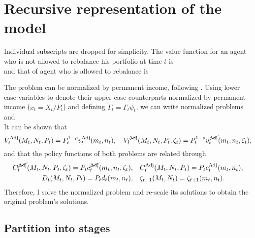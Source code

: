 \documentclass[./RiskyContrib.tex]{subfiles}
\begin{document}
\hypertarget{Recursive}{}
\section{Recursive representation of the model}


Individual subscripts are dropped for simplicity. The value function for
an agent who is not allowed to rebalance his portfolio at time $t$ is
\begin{equation*}
    
\end{equation*}
and that of agent who is allowed to rebalance is
\begin{equation*}
    
\end{equation*}

The problem can be normalized by permanent income, following
\cite{Carroll2020solvingmicrodsops}. Using lower case variables to
denote their upper-case counterparts normalized by permanent income ($x_t = X_t/P_t$)
and defining $\tilde{\Gamma}_t = \Gamma_{t}\psi_{t}$, we can write
normalized problems
\begin{equation}\label{eq:bellman_NAdj_norm}

\end{equation}
and
\begin{equation*}

\end{equation*}
It can be shown that
\begin{equation*}
V_{t}^{\text{Adj}}(M_t,N_t,P_t) = P_t^{1-\rho} v_{t}^{\text{Adj}}(m_t,n_t), \quad
V_{t}^{\cancel{\text{Adj}}}(M_t,N_t,P_t,\zeta_t) = P_t^{1-\rho} v_{t}^{\cancel{\text{Adj}}}(m_t,n_t,\zeta_t),
\end{equation*}
and that the policy functions of both problems are related through
\begin{equation*}
\begin{split}
C_t^{\cancel{\text{Adj}}}(M_t,N_t,P_t,\zeta_t) = P_t c_t^{\cancel{\text{Adj}}}(m_t,n_t,\zeta_t),& \quad C_t^{\text{Adj}}(M_t,N_t,P_t) = P_t c_t^{\text{Adj}}(m_t,n_t),\\
D_t(M_t,N_t,P_t) = P_t d_t(m_t,n_t),& \quad \zeta_{t+1}(M_t,N_t) = \zeta_{t+1}(m_t,n_t).
\end{split}
\end{equation*}
Therefore, I solve the normalized problem and re-scale its solutions to obtain
the original problem's solutions.

\subsection{Partition into stages}
\end{document}
